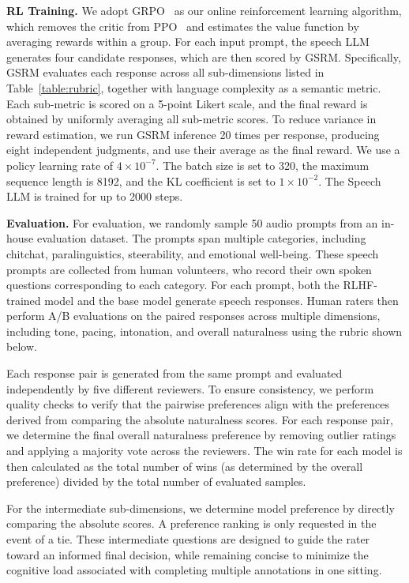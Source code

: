 \textbf{RL Training.}
We adopt GRPO~\cite{guo2025deepseek} as our online reinforcement learning algorithm, which removes the critic from PPO~\cite{schulman2017proximal} and estimates the value function by averaging rewards within a group. For each input prompt, the speech LLM generates four candidate responses, which are then scored by GSRM. Specifically, GSRM evaluates each response across all sub-dimensions listed in Table~\ref{table:rubric}, together with language complexity as a semantic metric. Each sub-metric is scored on a 5-point Likert scale, and the final reward is obtained by uniformly averaging all sub-metric scores. To reduce variance in reward estimation, we run GSRM inference 20 times per response, producing eight independent judgments, and use their average as the final reward. We use a policy learning rate of $4\times10^{-7}$. The batch size is set to 320, the maximum sequence length is 8192, and the KL coefficient is set to $1\times10^{-2}$. The Speech LLM is trained for up to 2000 steps.

\textbf{Evaluation.}
For evaluation, we randomly sample 50 audio prompts from an in-house evaluation dataset. The prompts span multiple categories, including chitchat, paralinguistics, steerability, and emotional well-being. These speech prompts are collected from human volunteers, who record their own spoken questions corresponding to each category. For each prompt, both the RLHF-trained model and the base model generate speech responses. Human raters then perform A/B evaluations on the paired responses across multiple dimensions, including tone, pacing, intonation, and overall naturalness using the rubric shown below.

Each response pair is generated from the same prompt and evaluated independently by five different reviewers. To ensure consistency, we perform quality checks to verify that the pairwise preferences align with the preferences derived from comparing the absolute naturalness scores. For each response pair, we determine the final overall naturalness preference by removing outlier ratings and applying a majority vote across the reviewers. The win rate for each model is then calculated as the total number of wins (as determined by the overall preference) divided by the total number of evaluated samples.  

For the intermediate sub-dimensions, we determine model preference by directly comparing the absolute scores. A preference ranking is only requested in the event of a tie. These intermediate questions are designed to guide the rater toward an informed final decision, while remaining concise to minimize the cognitive load associated with completing multiple annotations in one sitting.



